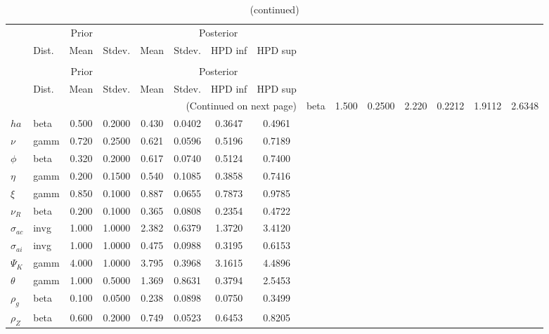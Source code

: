  
\begin{center}
\begin{longtable}{llcccccc} 
\caption{Results from Metropolis-Hastings (parameters)}
 \label{Table:MHPosterior:1}\\
\toprule 
  & \multicolumn{3}{c}{Prior}  &  \multicolumn{4}{c}{Posterior} \\
  \cmidrule(r{.75em}){2-4} \cmidrule(r{.75em}){5-8}
  & Dist. & Mean  & Stdev. & Mean & Stdev. & HPD inf & HPD sup\\
\midrule \endfirsthead 
\caption{(continued)}\\\toprule 
  & \multicolumn{3}{c}{Prior}  &  \multicolumn{4}{c}{Posterior} \\
  \cmidrule(r{.75em}){2-4} \cmidrule(r{.75em}){5-8}
  & Dist. & Mean  & Stdev. & Mean & Stdev. & HPD inf & HPD sup\\
\midrule \endhead 
\bottomrule \multicolumn{8}{r}{(Continued on next page)} \endfoot 
\bottomrule \endlastfoot 
${\sigma}$ & beta &   1.500 & 0.2500 &   2.220& 0.2212 &  1.9112 &  2.6348 \\ 
${ha}$ & beta &   0.500 & 0.2000 &   0.430& 0.0402 &  0.3647 &  0.4961 \\ 
$\nu$ & gamm &   0.720 & 0.2500 &   0.621& 0.0596 &  0.5196 &  0.7189 \\ 
${\phi}$ & beta &   0.320 & 0.2000 &   0.617& 0.0740 &  0.5124 &  0.7400 \\ 
${\eta}$ & gamm &   0.200 & 0.1500 &   0.540& 0.1085 &  0.3858 &  0.7416 \\ 
$\xi$ & gamm &   0.850 & 0.1000 &   0.887& 0.0655 &  0.7873 &  0.9785 \\ 
${\nu_R}$ & beta &   0.200 & 0.1000 &   0.365& 0.0808 &  0.2354 &  0.4722 \\ 
${\sigma_{ac}}$ & invg &   1.000 & 1.0000 &   2.382& 0.6379 &  1.3720 &  3.4120 \\ 
${\sigma_{ai}}$ & invg &   1.000 & 1.0000 &   0.475& 0.0988 &  0.3195 &  0.6153 \\ 
${\Psi_{K}}$ & gamm &   4.000 & 1.0000 &   3.795& 0.3968 &  3.1615 &  4.4896 \\ 
${\theta}$ & gamm &   1.000 & 0.5000 &   1.369& 0.8631 &  0.3794 &  2.5453 \\ 
${\rho_g}$ & beta &   0.100 & 0.0500 &   0.238& 0.0898 &  0.0750 &  0.3499 \\ 
${\rho_Z}$ & beta &   0.600 & 0.2000 &   0.749& 0.0523 &  0.6453 &  0.8205 \\ 

\end{longtable}
\end{center}
